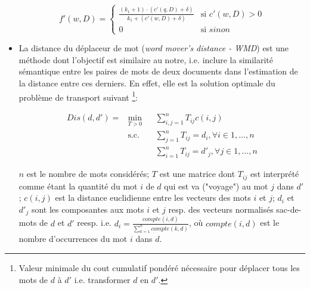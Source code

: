 \begin{itemize}
	\[
	f'(w,D) =
	\left\{ \begin{array}{ll}
	\frac{(k_1+1)\cdot (c'(q,D)+\delta)}{k_1+ (c'(w,D) + \delta)} & \text{si } c'(w,D) > 0 \\
	0 & \text{si } sinon
	\end{array}
	\right.
	\]
	\item \og La distance du déplaceur de mot \fg{} (\textit{word mover's distance - WMD}) \citep{kusner2015wordmoverdist} est une méthode dont l'objectif est similaire au notre, i.e. inclure la similarité sémantique entre les paires de mots de deux documents dans l'estimation de la distance entre ces derniers. En effet, elle est la solution optimale du problème de transport suivant \footnote{Valeur minimale du cout cumulatif pondéré nécessaire pour déplacer  tous les mots de $d$ à $d'$ i.e. transformer $d$ en $d'$.}:
	
	\begin{equation*}
	\begin{aligned}
Dis(d, d') = 	& \min\limits_{T>0}
	& & \sum\limits_{i,j=1}^n T_{ij} c(i,j) \\
	& \text{s.c.}
	& & \sum\limits_{j=1}^n T_{ij} = d_i, \forall i \in {1, \dots, n} \\
	& 
	& & \sum\limits_{i=1}^n T_{ij} = d'_j, \forall j \in {1, \dots, n}	
	\end{aligned}
	\end{equation*} 
	
	$n$ est le nombre de mots considérés; $T$ est une matrice dont $T_{ij}$ est interprété comme étant la quantité du mot $i$ de $d$ qui est va ("voyage") au mot $j$ dans $d'$; $c(i,j)$ est la distance euclidienne entre les vecteurs des mots $i$ et $j$; $d_i$ et $d'_j$ sont les composantes aux mots $i$ et $j$ resp. des vecteurs normalisés sac-de-mots de $d$ et $d'$ reesp. i.e. $d_i = \frac{compte(i, d)}{\sum\limits_{k=1}^n compte(k, d)}$, où $compte(i, d)$ est le nombre d'occurrences du mot $i$ dans $d$.
	
\end{itemize}


